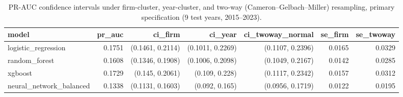 \begin{table}[htbp]
\centering
\caption{PR-AUC confidence intervals under firm-cluster, year-cluster, and two-way (Cameron--Gelbach--Miller) resampling, primary specification (9 test years, 2015--2023).}
\label{tab:v2_temporal_ci}
\small
\begin{tabular}{lrrrrrr}
\toprule
model & pr\_auc & ci\_firm & ci\_year & ci\_twoway\_normal & se\_firm & se\_twoway \\
\midrule
logistic\_regression & 0.1751 & (0.1461, 0.2114) & (0.1011, 0.2269) & (0.1107, 0.2396) & 0.0165 & 0.0329 \\
random\_forest & 0.1608 & (0.1346, 0.1908) & (0.1006, 0.2098) & (0.1049, 0.2167) & 0.0142 & 0.0285 \\
xgboost & 0.1729 & (0.145, 0.2061) & (0.109, 0.228) & (0.1117, 0.2342) & 0.0157 & 0.0312 \\
neural\_network\_balanced & 0.1338 & (0.1131, 0.1603) & (0.092, 0.165) & (0.0956, 0.1719) & 0.0122 & 0.0195 \\
\bottomrule
\end{tabular}
\end{table}
